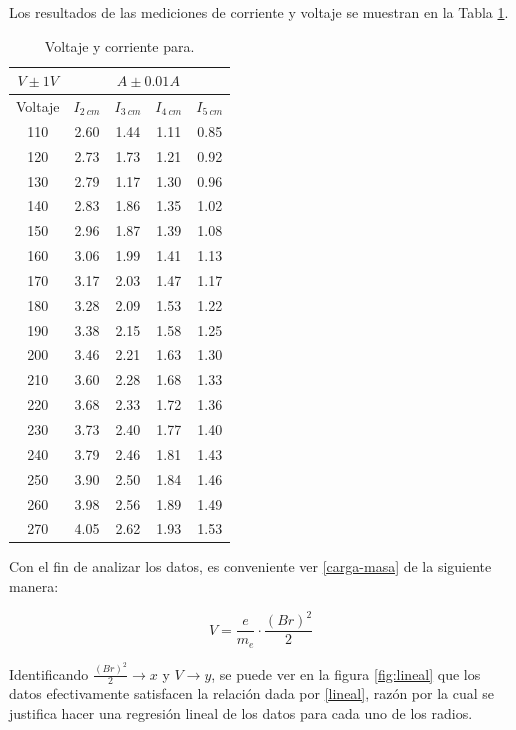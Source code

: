 \documentclass[prb,aps,twocolumn,preprintnumbers,amsmath,amssymb]{revtex4}
\begin{document}
Los resultados de las mediciones de corriente y voltaje se muestran en la Tabla \ref{Tabla 1}.\\

\begin{table}[h!]
	\caption{\label{Tabla 1}Voltaje y corriente para.}
	\begin{ruledtabular}
		\begin{tabular}{ccccc}
			\multicolumn{1}{c}{$V \pm 1V$} & \multicolumn{4}{c}{$A \pm 0.01A$ } \\
			\hline
			Voltaje &$I_{2\ cm}$&$I_{3\ cm}$&$I_{4\ cm}$&$I_{5\ cm}$\\
			\hline
			110 & 2.60 & 1.44 & 1.11 & 0.85 \\
			120 & 2.73 & 1.73 & 1.21 & 0.92\\
			130 & 2.79 & 1.17 & 1.30 & 0.96\\
			140 & 2.83 & 1.86 & 1.35 & 1.02\\
			150 & 2.96 & 1.87 & 1.39 & 1.08\\
			160 & 3.06 & 1.99 & 1.41 & 1.13\\
			170 & 3.17 & 2.03 & 1.47 & 1.17\\
			180 & 3.28 & 2.09 & 1.53 & 1.22\\
			190 & 3.38 & 2.15 & 1.58 & 1.25\\
			200 & 3.46 & 2.21 & 1.63 & 1.30\\
			210 & 3.60 & 2.28 & 1.68 & 1.33\\
			220 & 3.68 & 2.33 & 1.72 & 1.36\\
			230 & 3.73 & 2.40 & 1.77 & 1.40\\
			240 & 3.79 & 2.46 & 1.81 & 1.43\\
			250 & 3.90 & 2.50 & 1.84 & 1.46\\
			260 & 3.98 & 2.56 & 1.89 & 1.49\\
			270 & 4.05 & 2.62 & 1.93 & 1.53\\
		\end{tabular}
	\end{ruledtabular}
\end{table}

Con el fin de analizar los datos, es conveniente ver \eqref{carga-masa} de la siguiente manera:

\begin{equation}
V = \frac{e}{m_{e}}\cdot\frac{(Br)^2}{2} 
\label{lineal}
\end{equation}

Identificando $\frac{(Br)^2}{2} \rightarrow x$ y $V \rightarrow y$, se puede ver en la figura \ref{fig:lineal} que los datos efectivamente satisfacen la relación dada por \eqref{lineal}, razón por la cual se justifica hacer una regresión lineal de los datos para cada uno de los radios.\\
\end{document}
